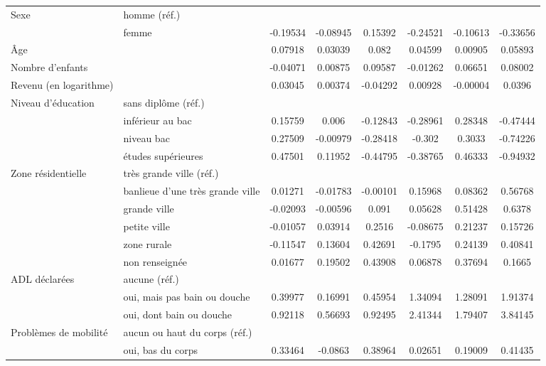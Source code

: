 \begin{Article}
\begin{refsection}[Bonnal]
\begin{table}
{\begin{threeparttable}
\begin{tabular}{l@{}l@{} S!{\qquad}S!{\qquad}S!{\quad} |S!{\qquad}S!{\qquad}S!{\quad}}
	Sexe & homme (réf.) && & && &\\
	& femme & -0.19534\sym{***} & -0.08945 & 0.15392 & -0.24521\sym{**} & -0.10613 & -0.33656\sym{*}\\\hline
	\^Age& & 0.07918\sym{***} & 0.03039\sym{***} & 0.082\sym{***} & 0.04599\sym{***} & 0.00905 & 0.05893\sym{***}\\\hline
	Nombre d'enfants & & -0.04071\sym{**} & 0.00875 & 0.09587\sym{***} & -0.01262 & 0.06651 & 0.08002\\\hline
	Revenu (en logarithme) & & 0.03045 & 0.00374 & -0.04292 & 0.00928 & -0.00004 & 0.0396\\\hline
	Niveau d'éducation& sans diplôme (réf.) && & && &\\
	& inférieur au bac & 0.15759 & 0.006 & -0.12843 & -0.28961\sym{*} & 0.28348 & -0.47444\sym{*}\\
	& niveau bac & 0.27509\sym{**} & -0.00979 & -0.28418 & -0.302 & 0.3033 & -0.74226\sym{**}\\
	& études supérieures & 0.47501\sym{***} & 0.11952 & -0.44795\sym{**}& -0.38765\sym{*} & 0.46333 & -0.94932\sym{***}\\\hline
	Zone résidentielle& très grande ville (réf.) && &&& &\\
	& banlieue d'une très grande ville & 0.01271 & -0.01783 & -0.00101 & 0.15968 & 0.08362 & 0.56768\\
	& grande ville & -0.02093 & -0.00596 & 0.091 & 0.05628 & 0.51428\sym{**} & 0.6378\sym{**}\\
	& petite ville & -0.01057 & 0.03914 & 0.2516\sym{*} & -0.08675 & 0.21237 & 0.15726\\
	& zone rurale & -0.11547 & 0.13604 & 0.42691\sym{***} & -0.1795 & 0.24139 & 0.40841\sym{*}\\
	& non renseignée & 0.01677 & 0.19502 & 0.43908\sym{**} & 0.06878 & 0.37694 & 0.1665\\\hline
	ADL déclarées& aucune (réf.) && & && &\\
	& oui, mais pas bain ou douche & 0.39977\sym{***} & 0.16991 & 0.45954\sym{***} & 1.34094\sym{***} & 1.28091\sym{***} & 1.91374\sym{***}\\
	& oui, dont bain ou douche & 0.92118\sym{***} & 0.56693\sym{***} & 0.92495\sym{***} & 2.41344\sym{***} & 1.79407\sym{***} & 3.84145\sym{***}\\\hline
	Problèmes de mobilité& aucun ou haut du corps (réf.)&& & && &\\
	& oui, bas du corps & 0.33464\sym{***} & -0.0863 & 0.38964\sym{***} & 0.02651 & 0.19009 & 0.41435\sym{**}\\

\end{tabular}
\end{threeparttable}}
\end{table}
\end{refsection}
\end{Article}
